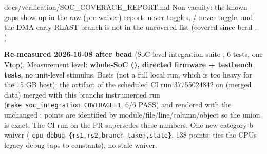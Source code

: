 \begin{relocated}{docs/verification/SOC_COVERAGE_REPORT.md}
Non-vacuity: the known gaps show up in the raw (pre-waiver) report:
 never toggles,  / 
never toggle, and the DMA early-RLAST branch is not in the uncovered
list (covered since bead , ).

\textbf{Re-measured 2026-10-08 after bead } (SoC-level
integration suite , 6 tests, one Vtop).
Measurement level: \textbf{whole-SoC (), directed
firmware + testbench tests}, no unit-level stimulus. Basis (not a full
local  run, which is too heavy for the 15 GB host):
the  artifact of the scheduled CI run 37755024842 on
 (merged  data) merged with this
branch\textquotesingle s instrumented  run
(\texttt{make\ soc\_\allowbreak{}integration\ COVERAGE=\allowbreak{}1},
6/6 PASS) and rendered with the unchanged
; points are identified by
module/\allowbreak{}file/\allowbreak{}line/\allowbreak{}column/\allowbreak{}object
so the union is exact. The CI  run on the PR
supersedes these numbers. One new category-b waiver (
\texttt{cpu\_\allowbreak{}debug\_\allowbreak{}\{rs1,\allowbreak{}rs2,\allowbreak{}branch\_\allowbreak{}taken,\allowbreak{}state\}},
138 points:  ties the CPU\textquotesingle s
legacy debug taps to constants), no stale waiver.


\end{relocated}
